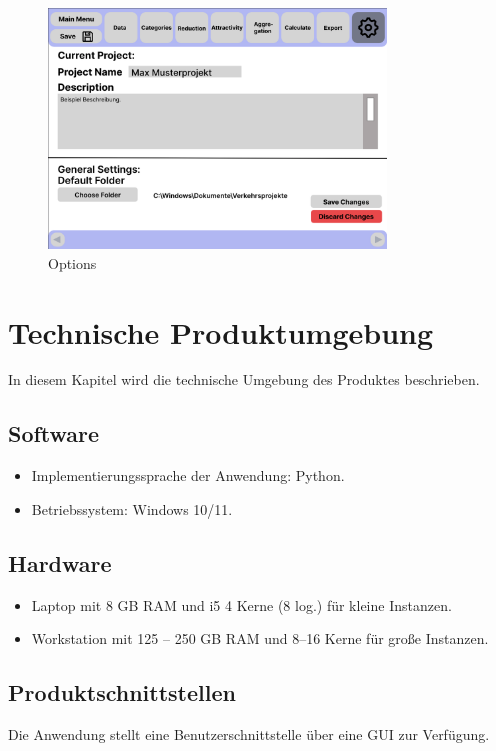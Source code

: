 \documentclass[parskip=full]{scrartcl} %
\begin{document}
\begin{figure}
    \centering
    \includegraphics[width=0.8\textwidth,cfbox=black 1pt 0pt]{pictures/Options.png}
    \caption{Options}
\end{figure}

\newpage

\newpage



\section{Technische Produktumgebung}
In diesem Kapitel wird die technische Umgebung des Produktes beschrieben.

\subsection{Software}
\begin{itemize}
    \item Implementierungssprache der Anwendung: Python.
    \item Betriebssystem: Windows 10/11.
\end{itemize}

\subsection{Hardware}
\begin{itemize}
    \item Laptop mit 8 GB RAM und i5 4 Kerne (8 log.) für kleine Instanzen.
    \item Workstation mit 125 – 250 GB RAM und 8–16 Kerne für große Instanzen.
\end{itemize}

\subsection{Produktschnittstellen}
Die Anwendung stellt eine Benutzerschnittstelle über eine GUI zur Verfügung.
\end{document}
